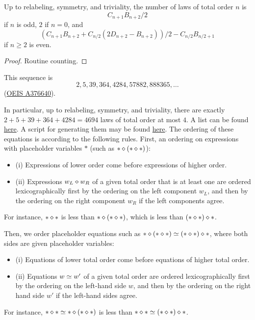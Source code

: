 \begin{lemma}\label{law-count-triv}
  Up to relabeling, symmetry, and triviality, the number of laws of total order $n$ is
  $$ C_{n+1} B_{n+2}/2$$
  if $n$ is odd, $2$ if $n = 0$, and
  $$ (C_{n+1} B_{n+2} + C_{n/2} (2D_{n+2} - B_{n+2}))/2 - C_{n/2} B_{n/2+1}$$
  if $n \geq 2$ is even.
\end{lemma}

\begin{proof}
  Routine counting.
\end{proof}

This sequence is
$$2, 5, 39, 364, 4284, 57882, 888365, \dots$$
(\href{https://oeis.org/A376640}{OEIS A376640}).

In particular, up to relabeling, symmetry, and triviality, there are exactly $2+5+39+364+4284=4694$ laws of total order at most $4$. A list can be found \href{https://github.com/teorth/equational_theories/blob/main/data/equations.txt}{here}. A script for generating them may be found \href{https://github.com/teorth/equational_theories/blob/main/scripts/generate_eqs_list.py}{here}. The ordering of these equations is according to the following rules.
First, an ordering on expressions with placeholder variables $\ast$ (such as $\ast \diamond (\ast \diamond \ast)$):
\begin{itemize}
\item (i)  Expressions of lower order come before expressions of higher order.
\item (ii) Expressions $w_L \diamond w_R$ of a given total order that is at least one are ordered lexicographically first by the ordering on the left component $w_L$, and then by the ordering on the right component $w_R$ if the left components agree.
\end{itemize}
For instance, $\ast \diamond \ast$ is less than $\ast \diamond (\ast \diamond \ast)$, which is less than $(\ast \diamond \ast) \diamond \ast$.

Then, we order placeholder equations such as $\ast \diamond (\ast \diamond \ast) \simeq (\ast \diamond \ast) \diamond \ast$, where both sides are given placeholder variables:
\begin{itemize}
\item (i)  Equations of lower total order come before equations of higher total order.
\item (ii) Equations $w \simeq w'$ of a given total order are ordered lexicographically first by the ordering on the left-hand side $w$, and then by the ordering on the right hand side $w'$ if the left-hand sides agree.
\end{itemize}
For instance, $\ast \diamond \ast \simeq \ast \diamond (\ast \diamond \ast)$ is less than $\ast \diamond \ast \simeq (\ast \diamond \ast) \diamond \ast$.

